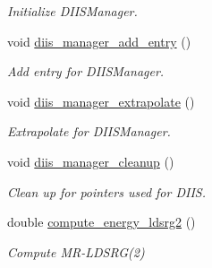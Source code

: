 \begin{DoxyCompactItemize}
\begin{DoxyCompactList}\small\item\em Initialize D\+I\+I\+S\+Manager. \end{DoxyCompactList}\item 
void \mbox{\hyperlink{classforte_1_1_s_a___m_r_d_s_r_g_ac05ae5a470ad387b2a2f342fab7947b4}{diis\+\_\+manager\+\_\+add\+\_\+entry}} ()
\begin{DoxyCompactList}\small\item\em Add entry for D\+I\+I\+S\+Manager. \end{DoxyCompactList}\item 
void \mbox{\hyperlink{classforte_1_1_s_a___m_r_d_s_r_g_a9116b856fb47c136eb37e85ab0e9a55c}{diis\+\_\+manager\+\_\+extrapolate}} ()
\begin{DoxyCompactList}\small\item\em Extrapolate for D\+I\+I\+S\+Manager. \end{DoxyCompactList}\item 
void \mbox{\hyperlink{classforte_1_1_s_a___m_r_d_s_r_g_adc0babbfa353c9a791b57c93a940016e}{diis\+\_\+manager\+\_\+cleanup}} ()
\begin{DoxyCompactList}\small\item\em Clean up for pointers used for D\+I\+IS. \end{DoxyCompactList}\item 
double \mbox{\hyperlink{classforte_1_1_s_a___m_r_d_s_r_g_a0570aa8ce0a6e94ebb25eb0cd06b90c6}{compute\+\_\+energy\+\_\+ldsrg2}} ()
\begin{DoxyCompactList}\small\item\em Compute M\+R-\/\+L\+D\+S\+RG(2) \end{DoxyCompactList}\end{DoxyCompactItemize}
